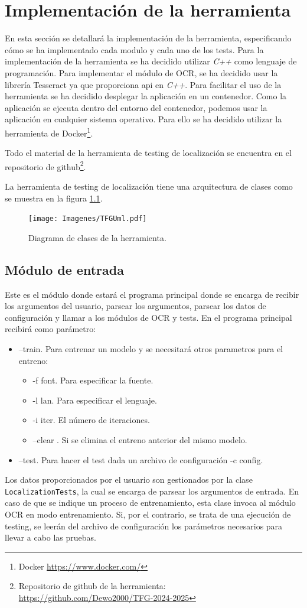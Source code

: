 \chapter{Implementación de la herramienta}
\label{cap:implementacion}

En esta sección se detallará la implementación de la herramienta, especificando cómo se ha implementado cada modulo y cada uno de los tests.  
Para la implementación de la herramienta se ha decidido utilizar \emph{C++} como lenguaje de programación. Para implementar el módulo de OCR, se ha decidido usar la librería Tesseract ya que proporciona api en \emph{C++}. Para facilitar el uso de la herramienta se ha decidido desplegar la aplicación en un contenedor. Como la aplicación se ejecuta dentro del entorno del contenedor, podemos usar la aplicación en cualquier sistema operativo. Para ello se ha decidido utilizar la herramienta de Docker\footnote{Docker \url{https://www.docker.com/}}.

Todo el material de la herramienta de testing de localización se encuentra en el repositorio de github\footnote{Repositorio de github de la herramienta:  \url{https://github.com/Dewo2000/TFG-2024-2025}}.

La herramienta de testing de localización tiene una arquitectura de clases como se muestra en la figura \ref{fig:UML}.
\begin{figure}[H]
	\centering
	\texttt{[image: Imagenes/TFGUml.pdf]}
	\caption{Diagrama de clases de la herramienta.}
	\label{fig:UML}
\end{figure}
\section{Módulo de entrada}
Este es el módulo donde estará el programa principal donde se encarga de recibir los argumentos del usuario, parsear los argumentos, parsear los datos de configuración y llamar a los módulos de OCR y tests.
En el programa principal recibirá como parámetro:
\begin{itemize}
	\item --train. Para entrenar un modelo y se necesitará otros parametros para el entreno:
	\begin{itemize}
		\item -f font. Para especificar la fuente.
		\item -l lan. Para especificar el lenguaje.
		\item -i iter. El número de iteraciones.
		\item --clear . Si se elimina el entreno anterior del mismo modelo.
	\end{itemize}
	\item --test. Para hacer el test dada un archivo de configuración -c config.
\end{itemize}
Los datos proporcionados por el usuario son gestionados por la clase \texttt{LocalizationTests}, la cual se encarga de parsear los argumentos de entrada. En caso de que se indique un proceso de entrenamiento, esta clase invoca al módulo OCR en modo entrenamiento. Si, por el contrario, se trata de una ejecución de testing, se leerán del archivo de configuración los parámetros necesarios para llevar a cabo las pruebas.

